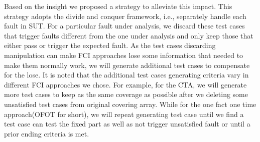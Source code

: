 \documentclass{sig-alternate}
\begin{document}
Based on the insight we proposed a strategy to alleviate this impact. This strategy adopts the divide and conquer framework, i.e., separately handle each fault in SUT. For a particular fault under analysis, we discard these test cases that trigger faults different from the one under analysis and only keep those that either pass or trigger the expected fault. As the test cases discarding manipulation can make FCI approaches lose some information that needed to make them normally work, we will generate additional test cases to compensate for the lose. It is noted that the additional test cases generating criteria vary in different FCI approaches we chose. For example, for the CTA, we will generate more test cases to keep as the same coverage as possible after we deleting some unsatisfied test cases from original covering array. While for the one fact one time approach(OFOT for short), we will repeat generating test case until we find a test case can test the fixed part as well as not trigger unsatisfied fault or until a prior ending criteria is met.



\end{document}
